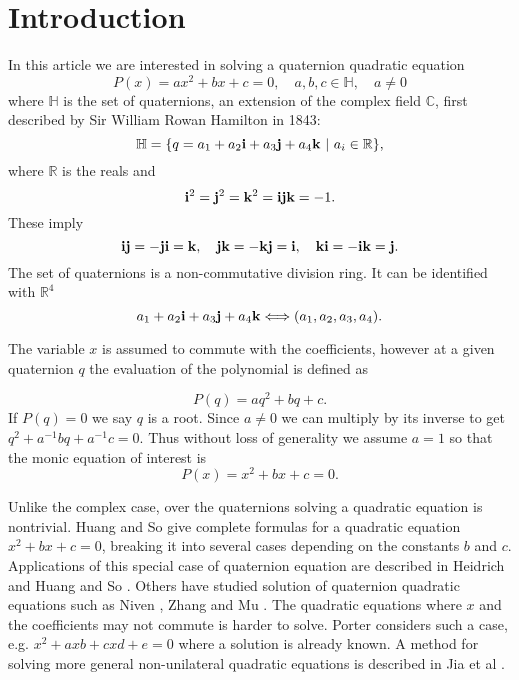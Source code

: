 \documentclass{article}
\theoremstyle{definition}
\begin{document}
\section{Introduction} In this article we are interested in solving a quaternion quadratic  equation
\begin{equation}
P(x)=ax^2+bx+ c=0, \quad a, b, c \in \mathbb{H}, \quad a \not =0
\end{equation}
where $\mathbb{H}$ is the set of quaternions, an extension of the
complex field $\mathbb{C}$, first described by Sir William Rowan
Hamilton in 1843:
\begin{equation}
\mathbb{H}=\{q=a_1+a_2{\bf i}+a_3{\bf j}+a_4{\bf k}~|~ a_i \in \mathbb{R} \},
\end{equation}
where $\mathbb{R}$ is the reals and
\begin{equation}
{\bf i}^2={\bf j}^2={\bf k}^2={\bf ijk}=-1.
\end{equation}
These imply
\begin{equation}
{\bf ij}=-{\bf ji}={\bf k},~~~{\bf jk}=-{\bf kj}={\bf i},~~~{\bf ki}=-{\bf ik}={\bf j}.
\end{equation}
The set of quaternions  is a non-commutative division ring. It can
be identified with $\mathbb{R}^4$
\begin{equation}
a_1+a_2{\bf i}+a_3{\bf j}+a_4{\bf k} \Longleftrightarrow (a_1,a_2,a_3,a_4).
\end{equation}

The variable $x$ is assumed to commute with the coefficients, however at a given quaternion $q$ the evaluation of the polynomial is defined as

\begin{equation}
P(q)=aq^2+bq+c.
\end{equation}
If $P(q)=0$ we say $q$ is a root. Since $a \not=0$ we can multiply by its inverse to get $q^2+a^{-1}bq+a^{-1}c=0$.
Thus  without loss of generality we assume $a=1$ so that the monic equation of interest is
\begin{equation} \label{quadeqn}
P(x)=x^2+bx+c=0.
\end{equation}

Unlike the complex case, over the quaternions solving a quadratic
equation is nontrivial. Huang and So \cite{Huang} give complete
formulas for a quadratic equation $x^2+bx+c=0$, breaking it into
several cases depending on the constants $b$ and $c$. Applications of
this special case of quaternion equation are described in Heidrich
\cite {Heidrich} and Huang and So \cite{Huang2}. Others have studied
solution of quaternion quadratic equations such as Niven
\cite{Niven}, Zhang and Mu \cite{Zhang2}. The quadratic equations
where $x$ and the coefficients may not commute  is harder to
solve. Porter \cite{Porter} considers such a case, e.g. $x^2
+axb+cxd+e=0$ where a solution is already known. A method for solving
more general non-unilateral quadratic equations is described in Jia
et al \cite{Jia}.
\end{document}
